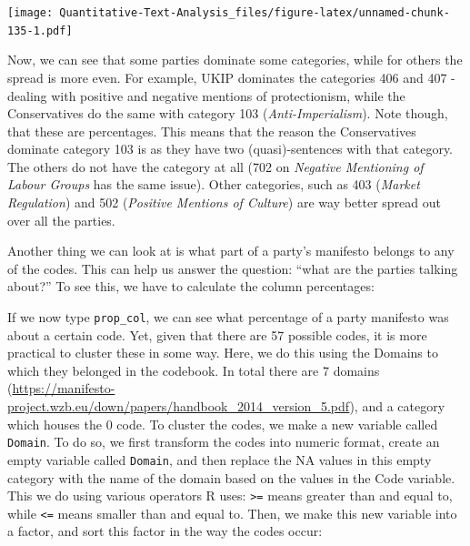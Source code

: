 \documentclass[
]{book}
\newenvironment{Shaded}{\begin{snugshade}}{\end{snugshade}}
\newcommand{\DecValTok}[1]{\textcolor[rgb]{0.00,0.00,0.81}{#1}}
\newcommand{\FunctionTok}[1]{\textcolor[rgb]{0.00,0.00,0.00}{#1}}
\newcommand{\NormalTok}[1]{#1}
\newcommand{\OtherTok}[1]{\textcolor[rgb]{0.56,0.35,0.01}{#1}}
\newcommand{\SpecialCharTok}[1]{\textcolor[rgb]{0.00,0.00,0.00}{#1}}
\newcommand{\StringTok}[1]{\textcolor[rgb]{0.31,0.60,0.02}{#1}}
\begin{document}
\texttt{[image: Quantitative-Text-Analysis\_files/figure-latex/unnamed-chunk-135-1.pdf]}

Now, we can see that some parties dominate some categories, while for others the spread is more even. For example, UKIP dominates the categories 406 and 407 - dealing with positive and negative mentions of protectionism, while the Conservatives do the same with category 103 (\emph{Anti-Imperialism}). Note though, that these are percentages. This means that the reason the Conservatives dominate category 103 is as they have two (quasi)-sentences with that category. The others do not have the category at all (702 on \emph{Negative Mentioning of Labour Groups} has the same issue). Other categories, such as 403 (\emph{Market Regulation}) and 502 (\emph{Positive Mentions of Culture}) are way better spread out over all the parties.

Another thing we can look at is what part of a party's manifesto belongs to any of the codes. This can help us answer the question: ``what are the parties talking about?'' To see this, we have to calculate the column percentages:

\begin{Shaded}
\end{Shaded}

If we now type \texttt{prop\_col}, we can see what percentage of a party manifesto was about a certain code. Yet, given that there are 57 possible codes, it is more practical to cluster these in some way. Here, we do this using the Domains to which they belonged in the codebook. In total there are 7 domains (\url{https://manifesto-project.wzb.eu/down/papers/handbook_2014_version_5.pdf}), and a category which houses the 0 code. To cluster the codes, we make a new variable called \texttt{Domain}. To do so, we first transform the codes into numeric format, create an empty variable called \texttt{Domain}, and then replace the NA values in this empty category with the name of the domain based on the values in the Code variable. This we do using various operators R uses: \texttt{\textgreater{}=} means greater than and equal to, while \texttt{\textless{}=} means smaller than and equal to. Then, we make this new variable into a factor, and sort this factor in the way the codes occur:
\end{document}
